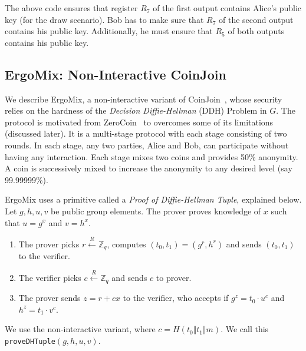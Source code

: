 \documentclass[11pt]{article}
\newcommand{\mixname}{ErgoMix\xspace}
\begin{document}

The above code ensures that register $R_7$ of the first output contains Alice's public key (for the draw scenario). Bob has to make sure that $R_7$ of the second output contains his public key. Additionally, he must ensure that $R_5$ of both outputs contains his public key.

\subsection{\mixname: Non-Interactive CoinJoin}
\label{mix}

We describe \mixname, a non-interactive variant of CoinJoin~\cite{coinjoin}, whose security relies on the hardness of the {\em Decision Diffie-Hellman} (DDH) Problem in $G$. The protocol is motivated from ZeroCoin~\cite{zerocoin} to overcomes some of its limitations (discussed later). It is a multi-stage protocol with each stage consisting of two rounds. In each stage, any two parties, Alice and Bob, can participate without having any interaction. Each stage mixes two coins and provides 50\% anonymity. A coin is successively mixed to increase the anonymity to any desired level (say 99.99999\%). 

\mixname uses a primitive called a {\em Proof of Diffie-Hellman Tuple}, explained below. Let $g, h, u, v$ be public group elements. The prover proves knowledge of $x$ such that $u={g}^x$ and $v={h}^x$. 
	\begin{enumerate}
		\item The prover picks $r \stackrel{R}{\leftarrow} \mathbb{Z}_q$, computes $(t_0, t_1) = ({g}^r, {h}^r)$ and sends $(t_0, t_1)$ to the verifier.
		\item The verifier picks $c \stackrel{R}{\leftarrow} \mathbb{Z}_q$ and sends $c$ to prover.
		\item The prover sends $z = r + cx$ to the verifier, who accepts if ${g}^z = {t_0}\cdot {u}^c$ and $h^z=t_1\cdot v^c$. %
	\end{enumerate}
	We use the non-interactive variant, where $c = H(t_0 \Vert t_1\Vert m)$. We call this \texttt{proveDHTuple}$(g, h, u, v)$.
	
\end{document}
